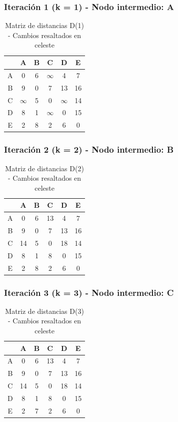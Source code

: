 \documentclass[12pt]{article}
\begin{document}
\subsubsection{Iteración 1 (k = 1) - Nodo intermedio: A}
\begin{table}[h!]
\centering
\begin{tabular}{|c|c|c|c|c|c|}
\hline
 & A & B & C & D & E \\\hline
A & 0 & 6 & $\infty$ & 4 & 7 \\\hline
B & 9 & 0 & 7 & \cellcolor{lightgreen} 13 & \cellcolor{lightgreen} 16 \\\hline
C & $\infty$ & 5 & 0 & $\infty$ & 14 \\\hline
D & 8 & 1 & $\infty$ & 0 & 15 \\\hline
E & 2 & \cellcolor{lightgreen} 8 & 2 & \cellcolor{lightgreen} 6 & 0 \\\hline
\end{tabular}
\caption{Matriz de distancias D(1) - Cambios resaltados en celeste}
\end{table}

\subsubsection{Iteración 2 (k = 2) - Nodo intermedio: B}
\begin{table}[h!]
\centering
\begin{tabular}{|c|c|c|c|c|c|}
\hline
 & A & B & C & D & E \\\hline
A & 0 & 6 & \cellcolor{lightgreen} 13 & 4 & 7 \\\hline
B & 9 & 0 & 7 & 13 & 16 \\\hline
C & \cellcolor{lightgreen} 14 & 5 & 0 & \cellcolor{lightgreen} 18 & 14 \\\hline
D & 8 & 1 & \cellcolor{lightgreen} 8 & 0 & 15 \\\hline
E & 2 & 8 & 2 & 6 & 0 \\\hline
\end{tabular}
\caption{Matriz de distancias D(2) - Cambios resaltados en celeste}
\end{table}

\subsubsection{Iteración 3 (k = 3) - Nodo intermedio: C}
\begin{table}[h!]
\centering
\begin{tabular}{|c|c|c|c|c|c|}
\hline
 & A & B & C & D & E \\\hline
A & 0 & 6 & 13 & 4 & 7 \\\hline
B & 9 & 0 & 7 & 13 & 16 \\\hline
C & 14 & 5 & 0 & 18 & 14 \\\hline
D & 8 & 1 & 8 & 0 & 15 \\\hline
E & 2 & \cellcolor{lightgreen} 7 & 2 & 6 & 0 \\\hline
\end{tabular}
\caption{Matriz de distancias D(3) - Cambios resaltados en celeste}
\end{table}
\end{document}
